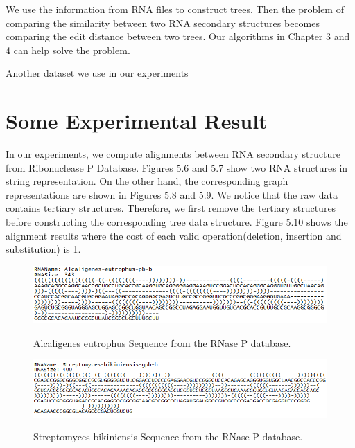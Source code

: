 We use the information from RNA files to construct trees. Then the problem of comparing the similarity between two RNA secondary structures becomes comparing the edit distance between two trees. Our algorithms in Chapter 3 and 4 can help solve the problem. 

Another dataset we use in our experiments 

\section{Some Experimental Result}
In our experiments, we compute alignments between RNA secondary structure from Ribonuclease P Database. Figures 5.6 and 5.7 show two RNA structures in string representation. On the other hand, the corresponding graph representations are shown in Figures 5.8 and 5.9. We notice that the raw data contains tertiary structures. Therefore, we first remove the tertiary structures before constructing the corresponding tree data structure. Figure 5.10 shows the alignment results where the cost of each valid operation(deletion, insertion and substitution) is 1.

\begin{figure}
		\centering
		\includegraphics[width=17cm,clip]{Figures/AlcaligenesString}
		\label{Alcaligenes eutrophus Sequence from the RNase P database.} 
		\caption{Alcaligenes eutrophus Sequence from the RNase P database.}
\end{figure}

\begin{figure}
		\centering
		\includegraphics[width=17cm,clip]{Figures/StreptomycesString}
		\label{Streptomyces bikiniensis Sequence from the Rnase P database.} 
		\caption{Streptomyces bikiniensis Sequence from the RNase P database. }
\end{figure} 

